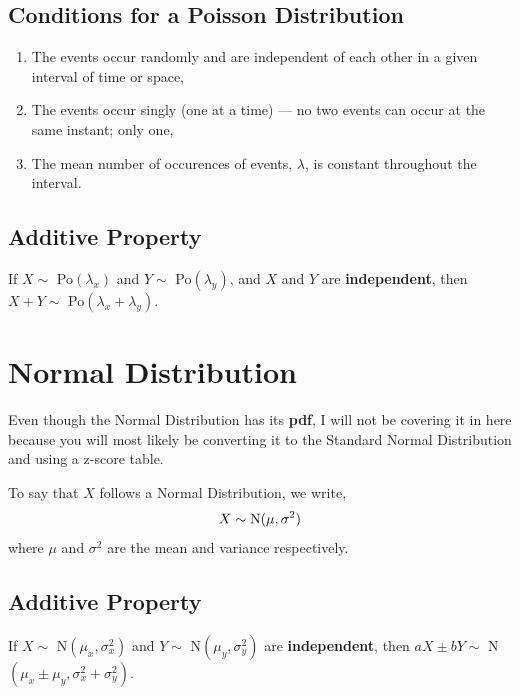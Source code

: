 \documentclass[../setup.tex]{subfiles}
\begin{document}
\subsection{Conditions for a Poisson Distribution}
\begin{enumerate}
	\item The events occur randomly and are independent of each other in a given interval of time or space,
	\item The events occur singly (one at a time) --- no two events can occur at the same instant; only one,
	\item The mean number of occurences of events, $\lambda$, is constant throughout the interval. 
\end{enumerate}

\subsection{Additive Property}
\begin{theorem}
If $X \sim$ Po$(\lambda_x)$ and $Y \sim$ Po$(\lambda_y)$, and $X$ and $Y$ are \textbf{independent}, then $X + Y \sim$ Po$(\lambda_x + \lambda_y)$.
\end{theorem}
\clearpage

\section{Normal Distribution}
Even though the Normal Distribution has its \textbf{pdf}, I will not be covering it in here because you will most likely be converting it to the Standard Normal Distribution and using a z-score table.
\begin{theorem}
To say that $X$ follows a Normal Distribution, we write,
\[ X \sim  \textup{N}(\mu, \sigma^2) \]
where $\mu$ and $\sigma^2$ are the mean and variance respectively.
\end{theorem}

\subsection{Additive Property}
\begin{theorem}
If $X\sim $\textup{ N}$(\mu_x, \sigma_x^2)$ and $Y\sim $\textup{ N}$(\mu_y, \sigma_y^2)$ are \textbf{independent}, then $aX \pm bY\sim $\textup{ N}$(\mu_x \pm \mu_y, \sigma_x^2 + \sigma_y^2)$. 
\end{theorem}
\end{document}
